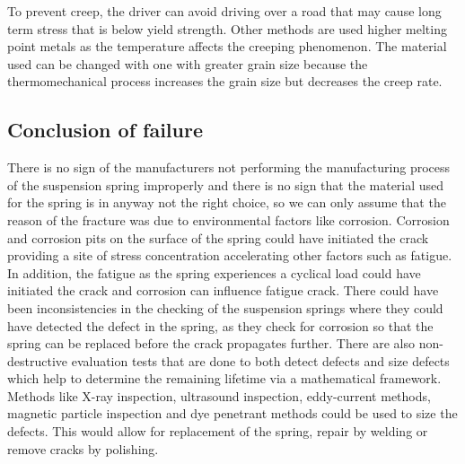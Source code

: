 \documentclass[11pt]{article}
\begin{document}
To prevent creep, the driver can avoid driving over a road that may cause long term stress that is below yield strength. Other methods are used higher melting point metals as the temperature affects the creeping phenomenon. The material used can be changed with one with greater grain size because the thermomechanical process increases the grain size but decreases the creep rate.  
\subsection{Conclusion of failure}
There is no sign of the manufacturers not performing the manufacturing process of the suspension spring improperly and there is no sign that the material used for the spring is in anyway not the right choice, so we can only assume that the reason of the fracture was due to environmental factors like corrosion. Corrosion and corrosion pits on the surface of the spring could have initiated the crack providing a site of stress concentration accelerating other factors such as fatigue. In addition, the fatigue as the spring experiences a cyclical load could have initiated the crack and corrosion can influence fatigue crack. There could have been inconsistencies in the checking of the suspension springs where they could have detected the defect in the spring, as they check for corrosion so that the spring can be replaced before the crack propagates further. There are also non-destructive evaluation tests that are done to both detect defects and size defects which help to determine the remaining lifetime via a mathematical framework. Methods like X-ray inspection, ultrasound inspection, eddy-current methods, magnetic particle inspection and dye penetrant methods could be used to size the defects. This would allow for replacement of the spring, repair by welding or remove cracks by polishing.
\end{document}
